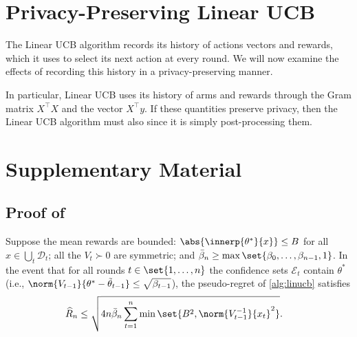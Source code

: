 \documentclass{article}
\newcommand{\inv}[1]{#1^{-1}}
\DeclarePairedDelimiter{\abs}||
\providecommand\transp{\top}
\let\transpsymbol\transp
\renewcommand{\transp}[1]{#1^\transpsymbol}
\newcommand{\Dset}[1]{\mathcal{D}_{#1}}
\newcommand{\Eset}[1]{\mathcal{E}_{#1}}
\begin{document}
\section{Privacy-Preserving Linear UCB}

The Linear UCB algorithm records its history of actions vectors and
rewards, which it uses to select its next action at every round.  We
will now examine the effects of recording this history in a
privacy-preserving manner.

In particular, Linear UCB uses its history of arms and rewards through
the Gram matrix $\transp{X}X$ and the vector $\transp{X}y$.  If these
quantities preserve privacy, then the Linear UCB algorithm must also
since it is simply post-processing them.




\newpage

\appendix

\section{Supplementary Material}

\subsection{Proof of }

\thmlinucbregret*

\begin{lemma}\label{lemma:linucb-regret}
  Suppose the mean rewards are bounded:
  $\abs{\innerp{\theta^*}{x}} \le B$ for all $x\in\bigcup_t\Dset{t}$;
  all the $V_t \succ 0$ are symmetric; and
  $\bar\beta_n \ge \max\set{\beta_0,\dotsc,\beta_{n-1},1}$.  In the
  event that for all rounds $t\in\set{1,\dotsc,n}$ the confidence sets
  $\Eset{t}$ contain $\theta^*$ (i.e.,
  $\norm{V_{t-1}}{\theta^* - \tilde\theta_{t-1}} \le \sqrt{\beta_{t-1}}$),
  the pseudo-regret of \cref{alg:linucb} satisfies
  \begin{align*}
    \widehat{R}_n &\le \sqrt{4n\bar\beta_n \sum_{t=1}^n\min\set{B^2, \norm{\inv{V_{t-1}}}{x_t}^2}}.
  \end{align*}
\end{lemma}
\end{document}
